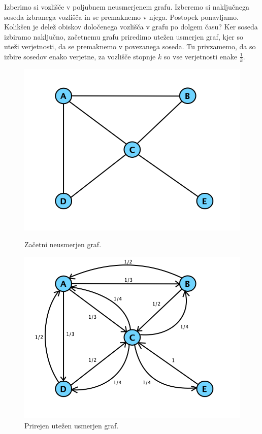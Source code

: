 \documentclass[mat1]{fmfdelo}
\begin{document}
\begin{zgled}
    Izberimo si vozlišče v poljubnem neusmerjenem grafu. Izberemo si naključnega soseda izbranega vozlišča in se premaknemo v njega. Postopek ponavljamo. Kolikšen je delež obiskov določenega vozlišča v grafu po dolgem času? Ker soseda izbiramo naključno, začetnemu grafu priredimo utežen usmerjen graf, kjer so uteži verjetnosti, da se premaknemo v povezanega soseda. Tu privzamemo, da so izbire sosedov enako verjetne, za vozlišče stopnje $k$ so vse verjetnosti enake $\frac{1}{k}$.
    \begin{figure}[!htb]
        \centering
        \begin{minipage}{0.5\textwidth}
            \centering
            \includegraphics[width=\textwidth]{grafUndir.png}
            \caption{Začetni neusmerjen graf.}
        \end{minipage}
        \hspace{-30pt}
        \begin{minipage}{0.5\textwidth}
            \centering
            \includegraphics[width=\textwidth]{grafDir.png}
            \caption{Prirejen utežen usmerjen graf.}
        \end{minipage}
    \end{figure}


\end{zgled}
\end{document}
